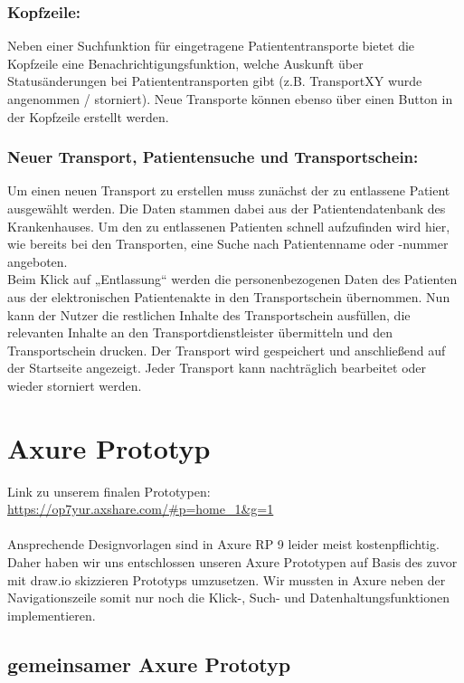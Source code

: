 \documentclass[a4paper, ngerman, 12pt]{scrartcl}
\begin{document}
\subsubsection*{Kopfzeile:}
Neben einer Suchfunktion für eingetragene Patiententransporte bietet die Kopfzeile eine Benachrichtigungsfunktion, welche Auskunft über Statusänderungen bei Patiententransporten gibt (z.B. TransportXY wurde angenommen / storniert). Neue Transporte können ebenso über einen Button in der Kopfzeile erstellt werden.
\subsubsection*{Neuer Transport, Patientensuche und Transportschein:}
Um einen neuen Transport zu erstellen muss zunächst der zu entlassene Patient ausgewählt werden. Die Daten stammen dabei aus der Patientendatenbank des Krankenhauses. Um den zu entlassenen Patienten schnell aufzufinden wird hier, wie bereits bei den Transporten, eine Suche nach Patientenname oder -nummer angeboten.\\

Beim Klick auf „Entlassung“ werden die personenbezogenen Daten des Patienten aus der elektronischen Patientenakte in den Transportschein übernommen. Nun kann der Nutzer die restlichen Inhalte des Transportschein ausfüllen, die relevanten Inhalte an den Transportdienstleister übermitteln und den Transportschein drucken. Der Transport wird gespeichert und anschließend auf der Startseite angezeigt. Jeder Transport kann nachträglich bearbeitet oder wieder storniert werden.
\section{Axure Prototyp}
Link zu unserem finalen Prototypen: \href{https://op7yur.axshare.com/#p=home_1&g=1}{https://op7yur.axshare.com/\#p=home\_1\&g=1}\\
\\
Ansprechende Designvorlagen sind in Axure RP 9 leider meist kostenpflichtig. Daher haben wir uns entschlossen unseren Axure Prototypen auf Basis des zuvor mit draw.io skizzieren Prototyps umzusetzen. Wir mussten in Axure neben der Navigationszeile somit nur noch die Klick-, Such- und Datenhaltungsfunktionen implementieren.
\subsection{gemeinsamer Axure Prototyp}
\end{document}
